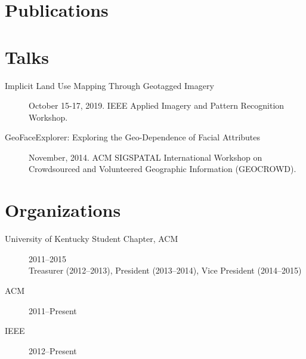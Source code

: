 \documentclass[12pt]{extarticle}
\begin{document}
\section*{Publications}

\nocite{*}
\printbibliography[heading=none]

\section*{Talks}

\begin{description}
    \item[Implicit Land Use Mapping Through Geotagged Imagery]
        October 15-17, 2019.
        IEEE Applied Imagery and Pattern Recognition Workshop.
    \item[GeoFaceExplorer: Exploring the Geo-Dependence of Facial Attributes]
        November, 2014.
        ACM SIGSPATAL International Workshop on Crowdsourced and Volunteered
        Geographic Information (GEOCROWD).
\end{description}

\section*{Organizations}

\begin{description}
    \item[University of Kentucky Student Chapter, ACM]
        2011--2015 \\
        Treasurer (2012--2013), President (2013--2014), Vice President
        (2014--2015)
    \item[ACM] 2011--Present
    \item[IEEE] 2012--Present
\end{description}
\end{document}

